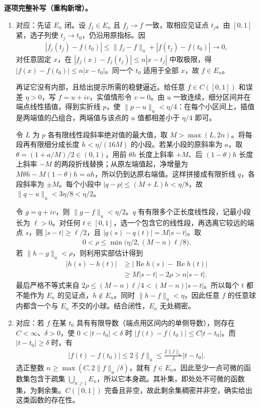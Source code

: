 \documentclass[../../main.tex]{subfiles}
\begin{document}
\begin{solution}
\textbf{逐项完整补写（重构新增）。}
\begin{enumerate}
\item 对应：先证 $E_n$ 闭。设 $f_j\in E_n$ 且 $f_j\to f$ 一致，取相应见证点 $t_j$。由 $[0,1]$ 紧，选子列使 $t_j\to t_0$，仍沿用原指标。因
\begin{align*}
|f_j(t_j)-f(t_0)|\le\|f_j-f\|_u+|f(t_j)-f(t_0)|\longrightarrow0,
\end{align*}
对任意固定 $x$，在 $|f_j(x)-f_j(t_j)|\le n|x-t_j|$ 中取极限，得 $|f(x)-f(t_0)|\le n|x-t_0|$。同一个 $t_0$ 适用于全部 $x$，故 $f\in E_n$。

再证它没有内部，且给出提示所需的稳健逼近。给任意 $f\in C([0,1])$ 和误差 $\eta>0$，写 $f=u+iv$，实值情形令 $v=0$。由 $u$ 一致连续，细分区间并在端点线性插值，得到实折线 $p$，使 $\|p-u\|_u<\eta/4$：在每个小区间上，插值是两端值的凸组合，两端值与该点的 $u$ 值都相差小于 $\eta/4$ 即可。

令 $L$ 为 $p$ 各有限线性段斜率绝对值的最大值，取 $M>\max(L,2n)$。将每段再有限细分成长度 $h<\eta/(16M)$ 的小段。若某小段的原斜率为 $a$，取 $\theta=(1+a/M)/2\in(0,1)$，用前 $\theta h$ 长度上斜率 $+M$、后 $(1-\theta)h$ 长度上斜率 $-M$ 的两段折线替换；从原左端值起，净增量为 $M\theta h-M(1-\theta)h=ah$，所以仍到达原右端值。这样拼接成有限折线 $q$，各段斜率为 $\pm M$。每个小段中 $|q-p|\le(M+L)h<\eta/8$，故 $\|q-u\|_u<3\eta/8<\eta/2$。

令 $g=q+iv$，则 $\|g-f\|_u<\eta/2$。$q$ 有有限多个正长度线性段，记最小段长为 $\ell>0$。对任何 $t\in[0,1]$，选一个包含它的线性段，再选离它较远的端点 $s$，则 $|s-t|\ge\ell/2$，且 $|q(s)-q(t)|=M|s-t|$。取
\begin{align*}
0<\rho\le\min\bigl(\eta/2,(M-n)\ell/8\bigr).
\end{align*}
若 $\|h-g\|_u<\rho$，则利用实部估计得到
\begin{align*}
|h(s)-h(t)|&\ge|\operatorname{Re}h(s)-\operatorname{Re}h(t)|\\
&\ge M|s-t|-2\rho>n|s-t|.
\end{align*}
最后严格不等式来自 $2\rho\le(M-n)\ell/4<(M-n)|s-t|$。所以每个 $t$ 都不能作为 $E_n$ 的见证点，$h\notin E_n$。同时 $\|h-f\|_u<\eta$，因此任意 $f$ 的任意球内都含一个与 $E_n$ 不交的小球。结合闭性，$E_n$ 无处稠密。
\item 对应：若 $f$ 在某 $t_0$ 具有有限导数（端点用区间内的单侧导数），则存在 $C<\infty$、$\delta>0$，使 $0<|t-t_0|<\delta$ 时 $|f(t)-f(t_0)|\le C|t-t_0|$。而 $|t-t_0|\ge\delta$ 时，有
\begin{align*}
|f(t)-f(t_0)|\le2\|f\|_u\le\frac{2\|f\|_u}{\delta}|t-t_0|.
\end{align*}
选正整数 $n\ge\max(C,2\|f\|_u/\delta)$，就有 $f\in E_n$。因此至少一点可微的函数集包含于疏集 $\bigcup_{n\ge1}E_n$，所以它本身疏。其补集，即处处不可微的函数集，为剩余集。$C([0,1])$ 完备且非空，故此剩余集稠密并非空，确实给出这类函数的存在性。
\end{enumerate}
\end{solution}
\end{document}
